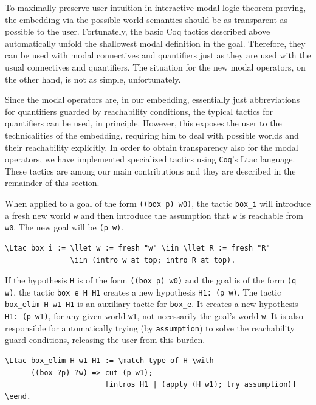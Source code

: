 \documentclass{llncs}
\newcommand{\red}[1]{\textcolor[rgb]{1,0,0}{#1}}
\newcommand{\blue}[1]{\textcolor[rgb]{0,0,1}{#1}}
\newcommand{\Ltac}{\red{Ltac}}
\newcommand{\llet}{\blue{let}}
\newcommand{\match}{\blue{match}}
\newcommand{\with}{\blue{with}}
\newcommand{\eend}{\blue{end}}
\newcommand{\iin}{\blue{in}}
\newcommand{\Coq}{\texttt{Coq}\xspace}
\begin{document}
\noindent
To maximally preserve user intuition in interactive modal logic
theorem proving, the embedding via the possible world semantics should
be as transparent as possible to the user. Fortunately, the basic Coq
tactics described above automatically unfold the shallowest modal
definition in the goal.  Therefore, they can be used with modal
connectives and quantifiers just as they are used with the usual
connectives and quantifiers. The situation for the new modal
operators, on the other hand, is not as simple, unfortunately.

Since the modal operators are, in our embedding, essentially just
abbreviations for quantifiers guarded by reachability conditions, the
typical tactics for quantifiers can be used, in principle.  However,
this exposes the user to the technicalities of the embedding,
requiring him to deal with possible worlds and their reachability
explicitly. In order to obtain transparency also for the modal
operators, we have implemented specialized tactics using \Coq's
Ltac language. These tactics are among our main contributions and they are described in the remainder of this section.

When applied to a goal of the form \texttt{((box p) w0)}, the tactic
\texttt{box\_i} will introduce a fresh new world \texttt{w} and then
introduce the assumption that \texttt{w} is reachable from
\texttt{w0}. The new goal will be \texttt{(p w)}.

\begin{Verbatim}[commandchars=\\\{\},fontsize=\verbsize]
\Ltac box_i := \llet w := fresh "w" \iin \llet R := fresh "R" 
               \iin (intro w at top; intro R at top).
\end{Verbatim}

\noindent 
If the hypothesis \texttt{H} is of the form \texttt{((box p)
w0)} and the goal is of the form \texttt{(q w)}, the tactic
\texttt{box\_e H H1} creates a new hypothesis \texttt{H1: (p w)}. The
tactic \texttt{box\_elim H w1 H1} is an auxiliary tactic for
\texttt{box\_e}. It creates a new hypothesis \texttt{H1: (p w1)}, for
any given world \texttt{w1}, not necessarily the goal's world
\texttt{w}. It is also responsible for automatically trying (by
\texttt{assumption}) to solve the reachability guard conditions,
releasing the user from this burden.

\begin{Verbatim}[commandchars=\\\{\},fontsize=\verbsize]
\Ltac box_elim H w1 H1 := \match type of H \with 
      ((box ?p) ?w) => cut (p w1); 
                       [intros H1 | (apply (H w1); try assumption)] \eend.
\end{Verbatim}
\end{document}

